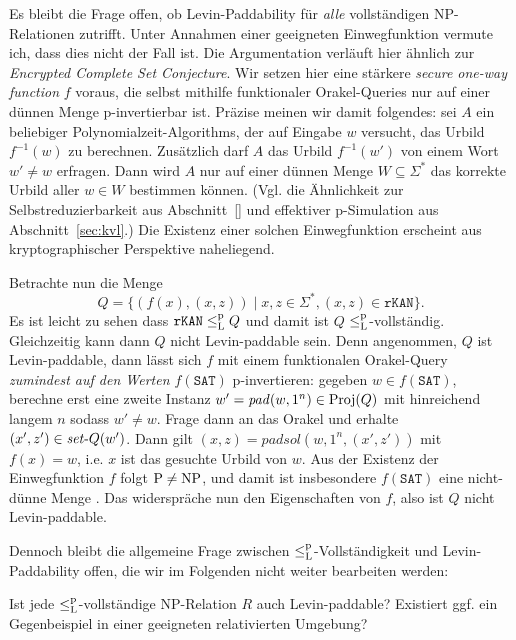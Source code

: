 Es bleibt die Frage offen, ob Levin-Paddability für \emph{alle} vollständigen NP-Relationen zutrifft. Unter Annahmen einer geeigneten Einwegfunktion vermute ich, dass dies nicht der Fall ist.
Die Argumentation verläuft hier ähnlich zur \emph{Encrypted Complete Set Conjecture}.
Wir setzen hier eine stärkere \emph{secure one-way function} \parencite{grollmann_complexity_1988} $f$ voraus, die selbst mithilfe funktionaler Orakel-Queries nur auf einer dünnen Menge p-invertierbar ist.
Präzise meinen wir damit folgendes: sei $A$ ein beliebiger Polynomialzeit-Algorithms, der auf Eingabe $w$ versucht, das Urbild $f^{-1}(w)$ zu berechnen. Zusätzlich darf $A$ das Urbild $f^{-1}(w')$ von einem Wort $w'\neq w$ erfragen. Dann wird $A$ nur auf einer dünnen Menge $W\subseteq\Sigma^*$ das korrekte Urbild aller $w\in W$ bestimmen können.
%
%
(Vgl. die Ähnlichkeit zur Selbstreduzierbarkeit aus Abschnitt~\ref{} und effektiver p-Simulation aus Abschnitt~\ref{sec:kvl}.)
Die Existenz einer solchen Einwegfunktion erscheint aus kryptographischer Perspektive naheliegend.

Betrachte nun die Menge
\[ Q = \{ (f(x), (x,z)) \mid x,z\in\Sigma^*, (x,z)\in\mathtt{rKAN}\}. \]
Es ist leicht zu sehen dass $\mathtt{rKAN}\leq_\mathrm{L}^\mathrm{p} Q$ und damit ist $Q$ $\leq_\mathrm{L}^\mathrm{p}$-vollständig.
Gleichzeitig kann dann $Q$ nicht Levin-paddable sein.
Denn angenommen, $Q$ ist Levin-paddable, dann lässt sich $f$ mit einem funktionalen Orakel-Query \emph{zumindest auf den Werten $f(\mathtt{SAT})$} p-invertieren: gegeben $w\in f(\mathtt{SAT})$, berechne erst eine zweite Instanz $w'=\mathit{pad}(w, 1^n)\in\operatorname{Proj}(Q)$ mit hinreichend langem $n$ sodass $w'\neq w$. Frage dann an das Orakel und erhalte $(x',z')\in \mathit{set}\text{-}{}Q(w')$.
Dann gilt $(x,z) = \mathit{padsol}(w, 1^n, (x',z'))$ mit $f(x)=w$, i.e. $x$ ist das gesuchte Urbild von $w$.
Aus der Existenz der Einwegfunktion $f$ folgt $\mathrm{P}\neq\mathrm{NP}$, und damit ist insbesondere $f(\mathtt{SAT})$ eine nicht-dünne Menge \parencite{mahaney_sparse_1982}.
Das widerspräche nun den Eigenschaften von $f$, also ist $Q$ nicht Levin-paddable.

Dennoch bleibt die allgemeine Frage zwischen $\leq_\mathrm{L}^\mathrm{p}$-Vollständigkeit und Levin-Paddability offen, die wir im Folgenden nicht weiter bearbeiten werden:
\begin{question}
    Ist jede $\leq_\mathrm{L}^\mathrm{p}$-vollständige NP-Relation $R$ auch Levin-paddable?
    Existiert ggf. ein Gegenbeispiel in einer geeigneten relativierten Umgebung?
\end{question}

